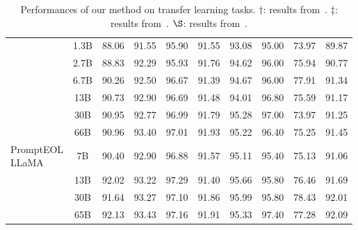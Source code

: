 \documentclass{article}
\begin{document}
\begin{table}[t]
{\begin{tabular}{lccccccccc}
 &  1.3B & 88.06 & 91.55 & 95.90 & 91.55 & 93.08 & 95.00 & 73.97 & 89.87 \\
 &  2.7B & 88.83 & 92.29 & 95.93 & 91.76 & 94.62 & 96.00 & 75.94 & 90.77 \\
 &  6.7B & 90.26 & 92.50 & 96.67 & 91.39 & 94.67 & 96.00 & 77.91 & 91.34 \\
 &  13B  & 90.73 & 92.90 & 96.69 & 91.48 & 94.01 & 96.80 & 75.59 & 91.17 \\
 &  30B  & 90.95 & 92.77 & 96.99 & 91.79 & 95.28 & 97.00 & 73.97 & 91.25 \\
 &  66\cellcolor{lightcyan}B  & 90.96\cellcolor{lightcyan} & 93.40\cellcolor{lightcyan} & 97.01\cellcolor{lightcyan} & 91.93\cellcolor{lightcyan} & 95.22\cellcolor{lightcyan} & 96.40\cellcolor{lightcyan} & 75.25\cellcolor{lightcyan} & 91.45\cellcolor{lightcyan} \\
\midrule
\multirowcell{4}[0pt][l]{PromptEOL\\LLaMA}
& 7B & 90.40 & 92.90 & 96.88 & 91.57 & 95.11 & 95.40 & 75.13 & 91.06 \\
& 13B & 92.02 & 93.22 & 97.29 & 91.40 & 95.66 & 95.80 & 76.46 & 91.69 \\
& 30B & 91.64 & 93.27 & 97.10 & 91.86 & 95.99 & 95.80 & 78.43 & 92.01 \\
& 65B\cellcolor{lightcyan} & 92.13\cellcolor{lightcyan} & 93.43\cellcolor{lightcyan} & 97.16\cellcolor{lightcyan} & 91.91\cellcolor{lightcyan} & 95.33\cellcolor{lightcyan} & 97.40\cellcolor{lightcyan} & 77.28\cellcolor{lightcyan} & 92.09\cellcolor{lightcyan} \\
\bottomrule
\end{tabular}}
\caption{ Performances of our method on transfer learning tasks.
  \(\dagger\): results from~\cite{gao2021simcse}.
  \(\ddagger \): results from~\cite{jiang2022promptbert}.
  \(\S\): results from~\cite{sentencet5}.
}\label{tab:tran_w_ft}
\vspace{-15pt}
\end{table}
\end{document}
